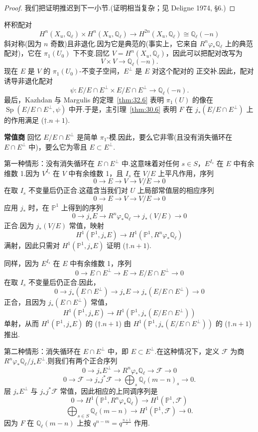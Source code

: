 \begin{proof}
我们把证明推迟到下一小节.(证明相当复杂；见 Deligne 1974, \S 6.)
\end{proof}

杯积配对
\[
H^{n}(X_u, \mathbb{Q}_{\ell}) \times H^{n}(X_u, \mathbb{Q}_{\ell}) \to H^{2n}(X_u, \mathbb{Q}_{\ell}) \cong \mathbb{Q}_{\ell}(-n)
\]
斜对称(因为 $n$ 奇数)且非退化.因为它是典范的(事实上，它来自 $R^{n}\varphi_{*}\mathbb{Q}_{\ell}$ 上的典范配对)，它在 $\pi_1(U_0)$ 下不变.回忆 $V = H^{n}(X_u, \mathbb{Q}_{\ell})$，因此可以把配对改写为
\[
V \times V \to \mathbb{Q}_{\ell}(-n).
\]
现在 $E$ 是 $V$ 的 $\pi_1(U_0)$-不变子空间，$E^{\perp}$ 是 $E$ 对这个配对的 正交补.因此，配对诱导非退化配对
\[
\psi \colon E/E \cap E^{\perp} \times E/E \cap E^{\perp} \to \mathbb{Q}_{\ell}(-n).
\]
最后，Kazhdan 与 Margulis 的定理~\ref{thm:32.6} 表明 $\pi_1(U)$ 的像在 $\operatorname{Sp}(E/E \cap E^{\perp}, \psi)$ 中开.于是，主引理~\ref{thm:30.6} 表明 $F$ 在 $j_{*}(E/E \cap E^{\perp})$ 上的作用满足 ($\dagger.n+1$).

\textbf{常值商} 回忆 $E/E \cap E^{\perp}$ 是简单 $\pi_1$-模.因此，要么它非零(且没有消失循环在 $E \cap E^{\perp}$ 中)，要么它为零且 $E \subset E^{\perp}$.

第一种情形：没有消失循环在 $E \cap E^{\perp}$ 中.这意味着对任何 $s \in S$，$E^{I_s}$ 在 $E$ 中有余维数 1.因为 $V^{I_s}$ 在 $V$ 中有余维数 1，且 $I_s$ 在 $V/E$ 上平凡作用，序列
\[
0 \to E \to V \to V/E \to 0
\]
在取 $I_s$ 不变量后仍正合.这蕴含当我们对 $U$ 上局部常值层的相应序列
\[
0 \to E \to V \to V/E \to 0
\]
应用 $j_{*}$ 时，在 $\mathbb{P}^{1}$ 上得到的序列
\[
0 \to j_{*}E \to R^{n}\varphi_{*}\mathbb{Q}_{\ell} \to j_{*}(V/E) \to 0
\]
正合.因为 $j_{*}(V/E)$ 常值，映射
\[
H^{1}(\mathbb{P}^{1}, j_{*}E) \to H^{1}(\mathbb{P}^{1}, R^{n}\varphi_{*}\mathbb{Q}_{\ell})
\]
满射，因此只需对 $H^{1}(\mathbb{P}^{1}, j_{*}E)$ 证明 ($\dagger.n+1$).

同样，因为 $E^{I_s}$ 在 $E$ 中有余维数 1，序列
\[
0 \to E \cap E^{\perp} \to E \to E/E \cap E^{\perp} \to 0
\]
在取 $I_s$ 不变量后仍正合.因此，
\[
0 \to j_{*}(E \cap E^{\perp}) \to j_{*}E \to j_{*}(E/E \cap E^{\perp}) \to 0
\]
正合，且因为 $j_{*}(E \cap E^{\perp})$ 常值，
\[
H^{1}(\mathbb{P}^{1}, j_{*}E) \to H^{1}(\mathbb{P}^{1}, j_{*}(E/E \cap E^{\perp}))
\]
单射，从而 $H^{1}(\mathbb{P}^{1}, j_{*}E)$ 的 ($\dagger.n+1$) 由 $H^{1}(\mathbb{P}^{1}, j_{*}(E/E \cap E^{\perp}))$ 的 ($\dagger.n+1$) 推出.

第二种情形：消失循环在 $E \cap E^{\perp}$ 中，即 $E \subset E^{\perp}$.在这种情况下，定义 $\mathcal{F}$ 为商 $R^{n}\varphi_{*}\mathbb{Q}_{\ell}/j_{*}E^{\perp}$.则我们有两个正合序列
\[
0 \to j_{*}E^{\perp} \to R^{n}\varphi_{*}\mathbb{Q}_{\ell} \to \mathcal{F} \to 0
\]
\[
0 \to \mathcal{F} \to j_{*}j^{*}\mathcal{F} \to \bigoplus_{s} \mathbb{Q}_{\ell}(m - n)_s \to 0.
\]
层 $j_{*}E^{\perp}$ 与 $j_{*}j^{*}\mathcal{F}$ 常值，因此相应的上同调序列是
\[
0 \to H^{1}(\mathbb{P}^{1}, R^{n}\varphi_{*}\mathbb{Q}_{\ell}) \to H^{1}(\mathbb{P}^{1}, \mathcal{F})
\]
\[
\bigoplus_{s \in S} \mathbb{Q}_{\ell}(m - n) \to H^{1}(\mathbb{P}^{1}, \mathcal{F}) \to 0.
\]
因为 $F$ 在 $\mathbb{Q}_{\ell}(m - n)$ 上按 $q^{n-m} = q^{\frac{n+1}{2}}$ 作用.


